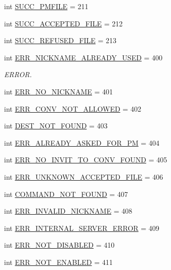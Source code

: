 \begin{DoxyCompactItemize}
\item 
int \hyperlink{namespaceserveur_1_1_server_ab3db5fdda6776cd1e74dec924e6d6574}{S\+U\+C\+C\+\_\+\+P\+M\+F\+I\+L\+E} = 211
\item 
int \hyperlink{namespaceserveur_1_1_server_aad1e9d7581726a0bc75c1467d6e42bff}{S\+U\+C\+C\+\_\+\+A\+C\+C\+E\+P\+T\+E\+D\+\_\+\+F\+I\+L\+E} = 212
\item 
int \hyperlink{namespaceserveur_1_1_server_acd1e4e31d269a159b14f6da936904872}{S\+U\+C\+C\+\_\+\+R\+E\+F\+U\+S\+E\+D\+\_\+\+F\+I\+L\+E} = 213
\item 
int \hyperlink{namespaceserveur_1_1_server_a4d3b6c592a26cc6826e3b69835623943}{E\+R\+R\+\_\+\+N\+I\+C\+K\+N\+A\+M\+E\+\_\+\+A\+L\+R\+E\+A\+D\+Y\+\_\+\+U\+S\+E\+D} = 400
\begin{DoxyCompactList}\small\item\em E\+R\+R\+O\+R. \end{DoxyCompactList}\item 
int \hyperlink{namespaceserveur_1_1_server_a8f7a9fdc4d39eff1a30a45c7938b5b9d}{E\+R\+R\+\_\+\+N\+O\+\_\+\+N\+I\+C\+K\+N\+A\+M\+E} = 401
\item 
int \hyperlink{namespaceserveur_1_1_server_a4512fc325db14fac1ebf0bec16386b8a}{E\+R\+R\+\_\+\+C\+O\+N\+V\+\_\+\+N\+O\+T\+\_\+\+A\+L\+L\+O\+W\+E\+D} = 402
\item 
int \hyperlink{namespaceserveur_1_1_server_ac42886a59c2147c57efa2e5523cc7119}{D\+E\+S\+T\+\_\+\+N\+O\+T\+\_\+\+F\+O\+U\+N\+D} = 403
\item 
int \hyperlink{namespaceserveur_1_1_server_a3cf6b579bb10ae775e915c456519c40a}{E\+R\+R\+\_\+\+A\+L\+R\+E\+A\+D\+Y\+\_\+\+A\+S\+K\+E\+D\+\_\+\+F\+O\+R\+\_\+\+P\+M} = 404
\item 
int \hyperlink{namespaceserveur_1_1_server_a0e6d24729e75dabd0920b2fad909f457}{E\+R\+R\+\_\+\+N\+O\+\_\+\+I\+N\+V\+I\+T\+\_\+\+T\+O\+\_\+\+C\+O\+N\+V\+\_\+\+F\+O\+U\+N\+D} = 405
\item 
int \hyperlink{namespaceserveur_1_1_server_a27e74ff26eae4e8de6820c0e3b91ade7}{E\+R\+R\+\_\+\+U\+N\+K\+N\+O\+W\+N\+\_\+\+A\+C\+C\+E\+P\+T\+E\+D\+\_\+\+F\+I\+L\+E} = 406
\item 
int \hyperlink{namespaceserveur_1_1_server_a4c9f787c7de5779b57e9a7393a0acaca}{C\+O\+M\+M\+A\+N\+D\+\_\+\+N\+O\+T\+\_\+\+F\+O\+U\+N\+D} = 407
\item 
int \hyperlink{namespaceserveur_1_1_server_a4abda6258ac6dc7f92187af7145e3a7a}{E\+R\+R\+\_\+\+I\+N\+V\+A\+L\+I\+D\+\_\+\+N\+I\+C\+K\+N\+A\+M\+E} = 408
\item 
int \hyperlink{namespaceserveur_1_1_server_adaad9aff6fb95fa9bf3c504c5a1eb40f}{E\+R\+R\+\_\+\+I\+N\+T\+E\+R\+N\+A\+L\+\_\+\+S\+E\+R\+V\+E\+R\+\_\+\+E\+R\+R\+O\+R} = 409
\item 
int \hyperlink{namespaceserveur_1_1_server_a29f22082a703724f3f9946d44f8d988a}{E\+R\+R\+\_\+\+N\+O\+T\+\_\+\+D\+I\+S\+A\+B\+L\+E\+D} = 410
\item 
int \hyperlink{namespaceserveur_1_1_server_a7b43a87e1df2463e5c27c867f42177ba}{E\+R\+R\+\_\+\+N\+O\+T\+\_\+\+E\+N\+A\+B\+L\+E\+D} = 411
\end{DoxyCompactItemize}


